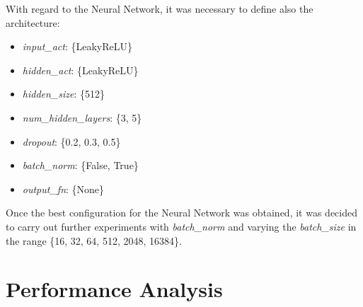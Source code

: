 \documentclass[../main]{subfiles}
\begin{document}
With regard to the Neural Network, it was necessary to define also the architecture:
\begin{itemize}
    \item \textit{input\_act}: \{LeakyReLU\}
    \item \textit{hidden\_act}: \{LeakyReLU\}
    \item \textit{hidden\_size}: \{512\}
    \item \textit{num\_hidden\_layers}: \{3, 5\}
    \item \textit{dropout}: \{0.2, 0.3, 0.5\}
    \item \textit{batch\_norm}: \{False, True\}
    \item \textit{output\_fn}: \{None\}
\end{itemize}

Once the best configuration for the Neural Network was obtained, it was decided to carry out further experiments with \textit{batch\_norm} and varying the \textit{batch\_size} in the range \{16, 32, 64, 512, 2048, 16384\}.

\section{Performance Analysis}
\end{document}
